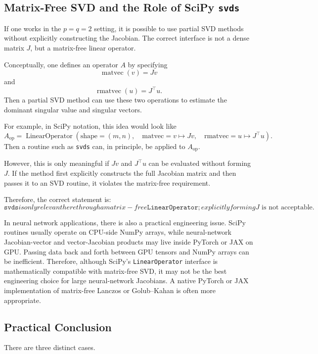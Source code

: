 \documentclass{article}
\begin{document}
\subsection{Matrix-Free SVD and the Role of SciPy \texttt{svds}}

If one works in the \(p=q=2\) setting, it is possible to use partial SVD methods without explicitly constructing the Jacobian. The correct interface is not a dense matrix \(J\), but a matrix-free linear operator.

Conceptually, one defines an operator \(A\) by specifying
\[
\operatorname{matvec}(v)=Jv
\]
and
\[
\operatorname{rmatvec}(u)=J^\top u.
\]
Then a partial SVD method can use these two operations to estimate the dominant singular value and singular vectors.

For example, in SciPy notation, this idea would look like
\[
A_{\mathrm{op}}
=
\operatorname{LinearOperator}
\left(
\text{shape}=(m,n),
\quad
\text{matvec}=v\mapsto Jv,
\quad
\text{rmatvec}=u\mapsto J^\top u
\right).
\]
Then a routine such as \texttt{svds} can, in principle, be applied to \(A_{\mathrm{op}}\).

However, this is only meaningful if \(Jv\) and \(J^\top u\) can be evaluated without forming \(J\). If the method first explicitly constructs the full Jacobian matrix and then passes it to an SVD routine, it violates the matrix-free requirement.

Therefore, the correct statement is:
\[
\boxed{
\texttt{svds} is only relevant here through a matrix-free \texttt{LinearOperator}; explicitly forming }J\text{ is not acceptable.}
\]

In neural network applications, there is also a practical engineering issue. SciPy routines usually operate on CPU-side NumPy arrays, while neural-network Jacobian-vector and vector-Jacobian products may live inside PyTorch or JAX on GPU. Passing data back and forth between GPU tensors and NumPy arrays can be inefficient. Therefore, although SciPy's \texttt{LinearOperator} interface is mathematically compatible with matrix-free SVD, it may not be the best engineering choice for large neural-network Jacobians. A native PyTorch or JAX implementation of matrix-free Lanczos or Golub--Kahan is often more appropriate.

\subsection{Practical Conclusion}

There are three distinct cases.
\end{document}
